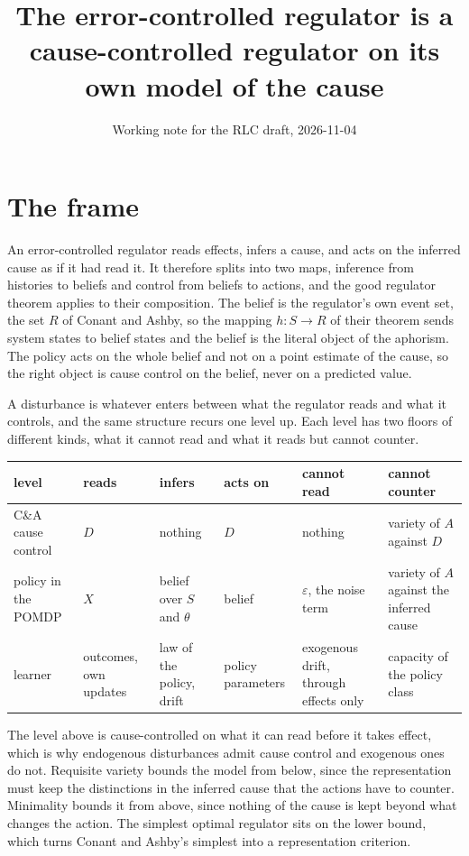 \documentclass[10pt]{article}
\title{The error-controlled regulator is a cause-controlled regulator on its own model of the cause}
\author{Working note for the RLC draft, 2026-11-04}
\date{}
\theoremstyle{plain}
\theoremstyle{remark}
\begin{document}
\maketitle

\section{The frame}
An error-controlled regulator reads effects, infers a cause, and acts on the inferred cause as if it had read it.
It therefore splits into two maps, inference from histories to beliefs and control from beliefs to actions, and the good regulator theorem applies to their composition.
The belief is the regulator's own event set, the set $R$ of Conant and Ashby, so the mapping $h\colon S \to R$ of their theorem sends system states to belief states and the belief is the literal object of the aphorism.
The policy acts on the whole belief and not on a point estimate of the cause, so the right object is cause control on the belief, never on a predicted value.

A disturbance is whatever enters between what the regulator reads and what it controls, and the same structure recurs one level up.
Each level has two floors of different kinds, what it cannot read and what it reads but cannot counter.

\begin{center}
\footnotesize
\begin{tabularx}{\linewidth}{lXXXXX}
\toprule
level & reads & infers & acts on & cannot read & cannot counter \\
\midrule
C\&A cause control & $D$ & nothing & $D$ & nothing & variety of $A$ against $D$ \\
policy in the POMDP & $X$ & belief over $S$ and $\theta$ & belief & $\varepsilon$, the noise term & variety of $A$ against the inferred cause \\
learner & outcomes, own updates & law of the policy, drift & policy parameters & exogenous drift, through effects only & capacity of the policy class \\
\bottomrule
\end{tabularx}
\end{center}

The level above is cause-controlled on what it can read before it takes effect, which is why endogenous disturbances admit cause control and exogenous ones do not.
Requisite variety bounds the model from below, since the representation must keep the distinctions in the inferred cause that the actions have to counter.
Minimality bounds it from above, since nothing of the cause is kept beyond what changes the action.
The simplest optimal regulator sits on the lower bound, which turns Conant and Ashby's simplest into a representation criterion.
\end{document}
